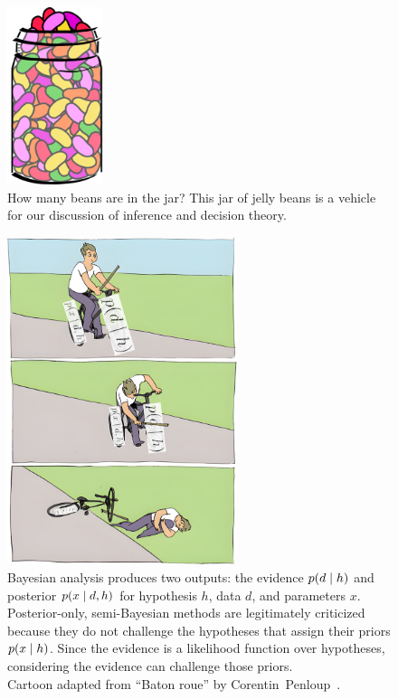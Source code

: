 \begin{figure}[tp]
\centering
\includegraphics[width=0.25\textwidth]{figures/searches_beans.pdf}
\caption[
How many beans are in the jar?
]{%
How many beans are in the jar? This jar of jelly beans is a vehicle for our
discussion of inference and decision theory.
}
\label{fig:significant_beans}
\end{figure}

\begin{figure}[tp]
\centering
\includegraphics[width=0.6\textwidth]{figures/searches_baton_roue_bayes.jpg}
\caption[
Bayesian analysis produces two outputs: the evidence and posterior
]{%
Bayesian analysis produces two outputs: the
evidence $p(d \mid h)$ and
posterior $p(x \mid d,h)$ for hypothesis $h$, data $d$, and parameters $x$.
Posterior-only, semi-Bayesian methods are legitimately criticized because they
do not challenge the hypotheses that assign their priors $p(x \mid h)$.
Since the evidence is a likelihood function over hypotheses, considering the
evidence can challenge those priors.
\\[0.5em]
Cartoon adapted from ``Baton roue'' by
Corentin~Penloup~\cite{penloup2011baton}.
}
\label{fig:searches_baton_roue_bayes}
\end{figure}

